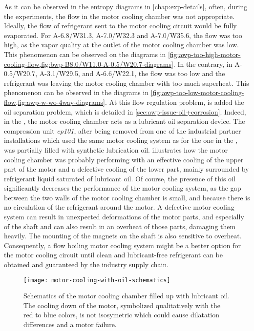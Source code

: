 As it can be observed in the entropy diagrams in
\cref{chap:exp-details}, often, during the experiments, the flow in
the motor cooling chamber was not appropriate. Ideally, the flow of
refrigerant sent to the motor cooling circuit would be fully
evaporated. For \OP{} A-6.8/W31.3, A-7.0/W32.3 and A-7.0/W35.6, the
flow was too high, as the vapor quality at the outlet of the motor
cooling chamber was low. This phenomenon can be observed on the
diagrams in
\cref{fig:awp-too-high-motor-cooling-flow,fig:bwp-B8.0/W11.0-A-0.5/W20.7-diagrams}. In
the contrary, in \OP{} A-0.5/W20.7, A-3.1/W29.5, and A-6.6/W22.1, the
flow was too low and the refrigerant was leaving the motor cooling
chamber with too much superheat. This phenomenon can be observed in
the diagrams in
\cref{fig:awp-too-low-motor-cooling-flow,fig:awp-w-wo-4way-diagrams}. At
this flow regulation problem, is added the oil separation problem,
which is detailed in \cref{sec:awp-issue-oil+corrosion}. Indeed, in
the \AWP{}, the motor cooling chamber acts as a lubricant oil
separation device. The compression unit \textit{cp101}, after being
removed from one of the industrial partner installations which used
the same motor cooling system as for the one in the \AWP{}, was
partially filled with synthetic lubrication
oil.  illustrates how the motor cooling
chamber was probably performing with an effective cooling of the upper
part of the motor and a defective cooling of the lower part, mainly
surrounded by refrigerant liquid saturated of lubricant oil. Of
course, the presence of this oil significantly decreases the
performance of the motor cooling system, as the gap between the two
walls of the motor cooling chamber is small, and because there is no
circulation of the refrigerant around the motor. A defective motor
cooling system can result in unexpected deformations of the motor
parts, and especially of the shaft and can also result in an overheat
of those parts, damaging them heavily. The mounting of the magnets on
the shaft is also sensitive to overheat. Consequently, a flow boiling
motor cooling system might be a better option for the motor cooling
circuit until clean and lubricant-free refrigerant can be obtained and
guaranteed by the industry supply chain.

\begin{figure}[htbp]
  \centering
  \texttt{[image: motor-cooling-with-oil-schematics]}
  \caption[Schematic of the motor cooling chamber filled up with
  lubricant oil]{Schematics of the motor cooling chamber filled up
    with lubricant oil. The cooling down of the motor, symbolized
    qualitatively with the red to blue colors, is not isosymetric
    which could cause dilatation differences and a motor failure.}
  \label{fig:awp-motor-with-oil}
\end{figure}

